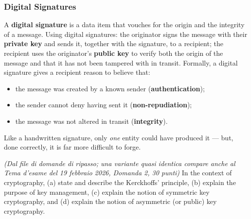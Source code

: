 \documentclass[12pt, a4paper]{article}
\newcounter{esercizio}[section]
\begin{document}
\subsubsection{Digital Signatures}
A \textbf{digital signature} is a data item that vouches for the origin and the integrity of a message. Using digital signatures: the originator signs the message with their \textbf{private key} and sends it, together with the signature, to a recipient; the recipient uses the originator's \textbf{public key} to verify both the origin of the message and that it has not been tampered with in transit. Formally, a digital signature gives a recipient reason to believe that:
\begin{itemize}
    \item the message was created by a known sender (\textbf{authentication});
    \item the sender cannot deny having sent it (\textbf{non-repudiation});
    \item the message was not altered in transit (\textbf{integrity}).
\end{itemize}
Like a handwritten signature, only \emph{one} entity could have produced it --- but, done correctly, it is far more difficult to forge.

\begin{tcolorbox}[colback=lightergray!10, colframe=tocsec, title=\textbf{Esercizio \theesercizio}]
\textit{(Dal file di domande di ripasso; una variante quasi identica compare anche al Tema d'esame del 19 febbraio 2026, Domanda 2, 30 punti)} In the context of cryptography, (a) state and describe the Kerckhoffs' principle, (b) explain the purpose of key management, (c) explain the notion of symmetric key cryptography, and (d) explain the notion of asymmetric (or public) key cryptography.
\end{tcolorbox}
\end{document}
